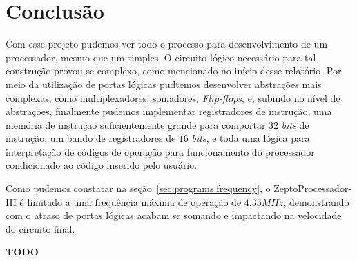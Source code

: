 \documentclass[12pt]{article}
\begin{document}










\section{Conclusão}\label{sec:Conclusao}

Com esse projeto pudemos ver todo o processo para desenvolvimento de um
processador, mesmo que um simples. O circuito lógico necessário para tal
construção provou-se complexo, como mencionado no início desse relatório. Por
meio da utilização de portas lógicas pudtemos desenvolver abstrações mais
complexas, como multiplexadores, somadores, \emph{Flip-flops}, e, subindo no
nível de abstrações, finalmente pudemos implementar registradores de instrução,
uma memória de instrução suficientemente grande para comportar $32$ \emph{bits}
de instrução, um bando de registradores de $16$ \emph{bits}, e toda uma lógica
para interpretação de códigos de operação para funcionamento do processador
condicionado ao código inserido pelo usuário.

Como pudemos constatar na seção~\ref{sec:programs:frequency}, o
ZeptoProcessador-III é limitado a uma frequência máxima de operação de
$4.35MHz$, demonstrando com o atraso de portas lógicas acabam se somando e
impactando na velocidade do circuito final.

\textbf{TODO}


\end{document}
